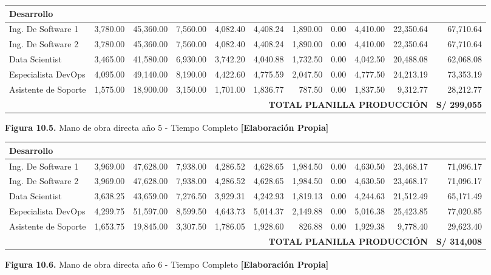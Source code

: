 \begin{table}[H]
\centering
\scriptsize
\renewcommand{\arraystretch}{1.15}
\setlength{\tabcolsep}{3pt}
\begin{tabular}{|l|r|r|r|r|r|r|r|r|r|r|}
\hline
\multicolumn{11}{|l|}{\textbf{Desarrollo}} \\ \hline
Ing. De Software 1 & 3,780.00 & 45,360.00 & 7,560.00 & 4,082.40 & 4,408.24 & 1,890.00 & 0.00 & 4,410.00 & 22,350.64 & 67,710.64 \\ \hline
Ing. De Software 2 & 3,780.00 & 45,360.00 & 7,560.00 & 4,082.40 & 4,408.24 & 1,890.00 & 0.00 & 4,410.00 & 22,350.64 & 67,710.64 \\ \hline
Data Scientist & 3,465.00 & 41,580.00 & 6,930.00 & 3,742.20 & 4,040.88 & 1,732.50 & 0.00 & 4,042.50 & 20,488.08 & 62,068.08 \\ \hline
Especialista DevOps & 4,095.00 & 49,140.00 & 8,190.00 & 4,422.60 & 4,775.59 & 2,047.50 & 0.00 & 4,777.50 & 24,213.19 & 73,353.19 \\ \hline
Asistente de Soporte & 1,575.00 & 18,900.00 & 3,150.00 & 1,701.00 & 1,836.77 & 787.50 & 0.00 & 1,837.50 & 9,312.77 & 28,212.77 \\ \hline
\multicolumn{10}{|r|}{\textbf{TOTAL PLANILLA PRODUCCIÓN}} & \textbf{S/ 299,055} \\ \hline
\end{tabular}

\vspace{0.2cm}
\textbf{Figura 10.5.} Mano de obra directa año 5 - Tiempo Completo \textbf{[Elaboración Propia]}
\end{table}

\begin{table}[H]
\centering
\scriptsize
\renewcommand{\arraystretch}{1.15}
\setlength{\tabcolsep}{3pt}
\begin{tabular}{|l|r|r|r|r|r|r|r|r|r|r|}
\hline
\multicolumn{11}{|l|}{\textbf{Desarrollo}} \\ \hline
Ing. De Software 1 & 3,969.00 & 47,628.00 & 7,938.00 & 4,286.52 & 4,628.65 & 1,984.50 & 0.00 & 4,630.50 & 23,468.17 & 71,096.17 \\ \hline
Ing. De Software 2 & 3,969.00 & 47,628.00 & 7,938.00 & 4,286.52 & 4,628.65 & 1,984.50 & 0.00 & 4,630.50 & 23,468.17 & 71,096.17 \\ \hline
Data Scientist & 3,638.25 & 43,659.00 & 7,276.50 & 3,929.31 & 4,242.93 & 1,819.13 & 0.00 & 4,244.63 & 21,512.49 & 65,171.49 \\ \hline
Especialista DevOps & 4,299.75 & 51,597.00 & 8,599.50 & 4,643.73 & 5,014.37 & 2,149.88 & 0.00 & 5,016.38 & 25,423.85 & 77,020.85 \\ \hline
Asistente de Soporte & 1,653.75 & 19,845.00 & 3,307.50 & 1,786.05 & 1,928.60 & 826.88 & 0.00 & 1,929.38 & 9,778.40 & 29,623.40 \\ \hline
\multicolumn{10}{|r|}{\textbf{TOTAL PLANILLA PRODUCCIÓN}} & \textbf{S/ 314,008} \\ \hline
\end{tabular}

\vspace{0.2cm}
\textbf{Figura 10.6.} Mano de obra directa año 6 - Tiempo Completo \textbf{[Elaboración Propia]}
\end{table}

